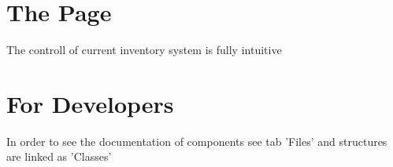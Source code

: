 \hypertarget{index_page_sec}{}\section{The Page}\label{index_page_sec}
The controll of current inventory system is fully intuitive \hypertarget{index_overview_sec}{}\section{For Developers}\label{index_overview_sec}
In order to see the documentation of components see tab 'Files' and structures are linked as 'Classes' 
